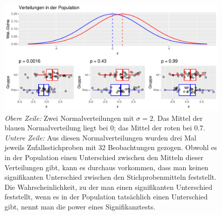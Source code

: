 \documentclass[oneside, 10pt]{book}\usepackage[]{graphicx}\usepackage[]{xcolor}
\newenvironment{knitrout}{}{} %
\begin{document}
\begin{knitrout}
\color{fgcolor}\begin{figure}[tp]

{\centering \includegraphics[width=.7\textwidth]{figs/unnamed-chunk-410-1} 

}

\caption{\textit{Obere Zeile:} Zwei Normalverteilungen mit $\sigma = 2$. Das Mittel der blauen Normalverteilung liegt bei $0$; das Mittel der roten bei $0.7$. \textit{Untere Zeile:} Aus diesen Normalverteilungen wurden drei Mal jeweils Zufallsstichproben mit 32 Beobachtungen gezogen. Obwohl es in der Population einen Unterschied zwischen den Mitteln dieser Verteilungen gibt, kann es durchaus vorkommen, dass man keinen signifikanten Unterschied zwischen den Stichprobenmitteln feststellt. Die Wahrscheinlichkeit, zu der man einen signifikanten Unterschied feststellt, wenn es in der Population tatsächlich einen Unterschied gibt, nennt man die power eines Signifikanztests.\label{fig:power}}\label{fig:unnamed-chunk-410}
\end{figure}

\end{knitrout}
\end{document}
